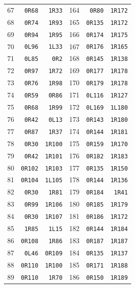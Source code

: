 \begin{longtable}{@{}rrr@{\hspace{20pt}}rrr@{}}
67 & \texttt{0R68} & \texttt{1R33} & 164 & \texttt{0R80} & \texttt{1R172}\\
68 & \texttt{0R74} & \texttt{1R93} & 165 & \texttt{0R135} & \texttt{1R172}\\
69 & \texttt{0R94} & \texttt{1R95} & 166 & \texttt{0R174} & \texttt{1R175}\\
70 & \texttt{0L96} & \texttt{1L33} & 167 & \texttt{0R176} & \texttt{1R165}\\
71 & \texttt{0L85} & \texttt{0R2} & 168 & \texttt{0R145} & \texttt{1R138}\\
72 & \texttt{0R97} & \texttt{1R72} & 169 & \texttt{0R177} & \texttt{1R178}\\
73 & \texttt{0R76} & \texttt{1R98} & 170 & \texttt{0R179} & \texttt{1R178}\\
74 & \texttt{0R59} & \texttt{0R86} & 171 & \texttt{0L116} & \texttt{1R127}\\
75 & \texttt{0R68} & \texttt{1R99} & 172 & \texttt{0L169} & \texttt{1L180}\\
76 & \texttt{0R42} & \texttt{0L13} & 173 & \texttt{0R143} & \texttt{1R180}\\
77 & \texttt{0R87} & \texttt{1R37} & 174 & \texttt{0R144} & \texttt{1R181}\\
78 & \texttt{0R30} & \texttt{1R100} & 175 & \texttt{0R159} & \texttt{1R170}\\
79 & \texttt{0R42} & \texttt{1R101} & 176 & \texttt{0R182} & \texttt{1R183}\\
80 & \texttt{0R102} & \texttt{1R103} & 177 & \texttt{0R135} & \texttt{1R150}\\
81 & \texttt{0R104} & \texttt{1L105} & 178 & \texttt{0R144} & \texttt{1R136}\\
82 & \texttt{0R30} & \texttt{1R81} & 179 & \texttt{0R184} & \texttt{1R41}\\
83 & \texttt{0R99} & \texttt{1R106} & 180 & \texttt{0R185} & \texttt{1R179}\\
84 & \texttt{0R30} & \texttt{1R107} & 181 & \texttt{0R186} & \texttt{1R172}\\
85 & \texttt{1R85} & \texttt{1L15} & 182 & \texttt{0R144} & \texttt{1R184}\\
86 & \texttt{0R108} & \texttt{1R86} & 183 & \texttt{0R187} & \texttt{1R187}\\
87 & \texttt{0L46} & \texttt{0R109} & 184 & \texttt{0R135} & \texttt{1R137}\\
88 & \texttt{0R110} & \texttt{1R100} & 185 & \texttt{0R171} & \texttt{1R188}\\
89 & \texttt{0R110} & \texttt{1R70} & 186 & \texttt{0R150} & \texttt{1R189}\\

\end{longtable}
